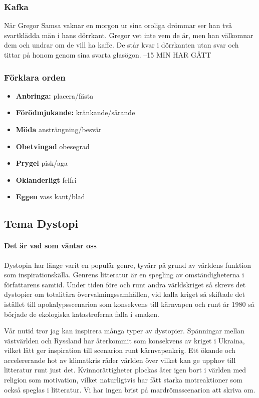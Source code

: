 \subsubsection{Kafka}
När Gregor Samsa vaknar en morgon ur sina oroliga drömmar ser han två svartklädda män i hans dörrkant. Gregor vet inte vem de är, men han välkomnar dem och undrar om de vill ha kaffe. De står kvar i dörrkanten utan svar och tittar på honom genom sina svarta glasögon. --15 MIN HAR GÅTT

\subsubsection{Förklara orden}
\begin{itemize}
	\item \textbf{Anbringa:} placera/fästa
	\item \textbf{Förödmjukande:} kränkande/sårande
	\item \textbf{Möda} ansträngning/besvär
	\item \textbf{Obetvingad} obesegrad
	\item \textbf{Prygel} pisk/aga
	\item \textbf{Oklanderligt} felfri
	\item \textbf{Eggen} vass kant/blad
\end{itemize}

\newpage
\subsection{Tema Dystopi}

\paragraph{Det är vad som väntar oss}

Dystopin har länge varit en populär genre, tyvärr på grund av världens funktion som inspirationskälla. Genrens litteratur är en spegling av omständigheterna i författarens samtid. Under tiden före och runt andra världskriget så skrevs det dystopier om totalitära övervakningssamhällen, vid kalla kriget så skiftade det istället till apokalypsscenarion som konsekvens till kärnvapen och runt år 1980 så började de ekologiska katastroferna falla i smaken.

Vår nutid tror jag kan inspirera många typer av dystopier. Spänningar mellan västvärlden och Ryssland har återkommit som konsekvens av kriget i Ukraina, vilket lätt ger inspiration till scenarion runt kärnvapenkrig. Ett ökande och accelererande hot av klimatkris råder världen över vilket kan ge upphov till litteratur runt just det. Kvinnorättigheter plockas åter igen bort i världen med religion som motivation, vilket naturligtvis har fått starka motreaktioner som också speglas i litteratur. Vi har ingen brist på mardrömsscenarion att skriva om.

